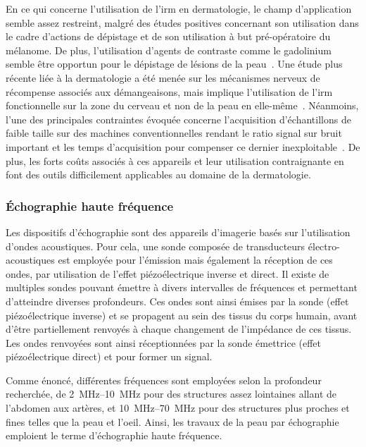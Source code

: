 En ce qui concerne l'utilisation de l'\gls{irm} en dermatologie, le champ d'application semble assez restreint, malgré des études positives concernant son utilisation dans le cadre d'actions de dépistage et de son utilisation à but pré-opératoire du mélanome. De plus, l'utilisation d'agents de contraste comme le gadolinium semble être opportun pour le dépistage de lésions de la peau~\cite{Zemtsov1993}. Une étude plus récente liée à la dermatologie a été menée sur les mécanismes nerveux de récompense associés aux démangeaisons, mais implique l'utilisation de l'\gls{irm} fonctionnelle sur la zone du cerveau et non de la peau en elle-même~\cite{Mueller2017}. Néanmoins, l'une des principales contraintes évoquée concerne l'acquisition d'échantillons de faible taille sur des machines conventionnelles rendant le ratio signal sur bruit important et les temps d'acquisition pour compenser ce dernier inexploitable~\cite{Gobel2016}. De plus, les forts coûts associés à ces appareils et leur utilisation contraignante en font des outils difficilement applicables au domaine de la dermatologie.\par

\subsubsection{Échographie haute fréquence}
Les dispositifs d'échographie sont des appareils d'imagerie basés sur l'utilisation d'ondes acoustiques. Pour cela, une sonde composée de transducteurs électro-acoustiques est employée pour l'émission mais également la réception de ces ondes, par utilisation de l'effet piézoélectrique inverse et direct. Il existe de multiples sondes pouvant émettre à divers intervalles de fréquences et permettant d'atteindre diverses profondeurs. Ces ondes sont ainsi émises par la sonde (effet piézoélectrique inverse) et se propagent au sein des tissus du corps humain, avant d'être partiellement renvoyés à chaque changement de l'impédance de ces tissus. Les ondes renvoyées sont ainsi réceptionnées par la sonde émettrice (effet piézoélectrique direct) et pour former un signal.\par

Comme énoncé, différentes fréquences sont employées selon la profondeur recherchée, de \SIrange{2}{10}{\mega\hertz} pour des structures assez lointaines allant de l'abdomen aux artères, et \SIrange{10}{70}{\mega\hertz} pour des structures plus proches et fines telles que la peau et l'oeil. Ainsi, les travaux de la peau par échographie emploient le terme d'échographie haute fréquence.\par

